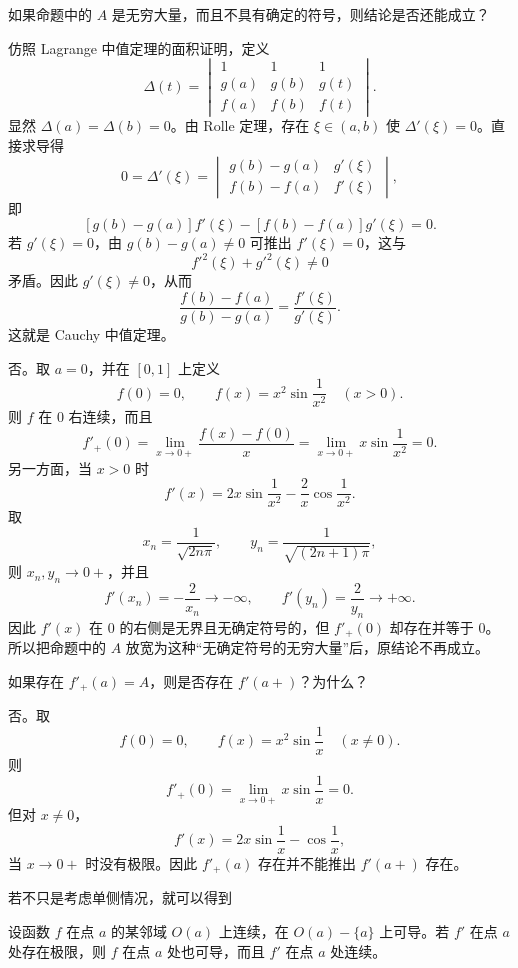\begin{xthought}[2]
如果命题中的 $A$ 是无穷大量，而且不具有确定的符号，则结论是否还能成立？
\end{xthought}
\begin{xsolution}
仿照 Lagrange 中值定理的面积证明，定义
\[
  \Delta(t)=
  \begin{vmatrix}
    1&1&1\\
    g(a)&g(b)&g(t)\\
    f(a)&f(b)&f(t)
  \end{vmatrix}.
\]
显然 $\Delta(a)=\Delta(b)=0$。由 Rolle 定理，存在 $\xi\in(a,b)$ 使 $\Delta'(\xi)=0$。直接求导得
\[
  0=\Delta'(\xi)
  =
  \begin{vmatrix}
    g(b)-g(a)&g'(\xi)\\
    f(b)-f(a)&f'(\xi)
  \end{vmatrix},
\]
即
\[
  [g(b)-g(a)]f'(\xi)-[f(b)-f(a)]g'(\xi)=0.
\]
若 $g'(\xi)=0$，由 $g(b)-g(a)\neq0$ 可推出 $f'(\xi)=0$，这与
\[
  f'^2(\xi)+g'^2(\xi)\neq0
\]
矛盾。因此 $g'(\xi)\neq0$，从而
\[
  \frac{f(b)-f(a)}{g(b)-g(a)}
  =\frac{f'(\xi)}{g'(\xi)}.
\]
这就是 Cauchy 中值定理。

否。取 $a=0$，并在 $[0,1]$ 上定义
\[
  f(0)=0,
  \qquad
  f(x)=x^2\sin\frac1{x^2}\quad(x>0).
\]
则 $f$ 在 $0$ 右连续，而且
\[
  f'_+(0)=\lim_{x\to0+}\frac{f(x)-f(0)}x
  =\lim_{x\to0+}x\sin\frac1{x^2}=0.
\]
另一方面，当 $x>0$ 时
\[
  f'(x)=2x\sin\frac1{x^2}-\frac2x\cos\frac1{x^2}.
\]
取
\[
  x_n=\frac1{\sqrt{2n\pi}},
  \qquad
  y_n=\frac1{\sqrt{(2n+1)\pi}},
\]
则 $x_n,y_n\to0+$，并且
\[
  f'(x_n)=-\frac2{x_n}\to-\infty,
  \qquad
  f'(y_n)=\frac2{y_n}\to+\infty.
\]
因此 $f'(x)$ 在 $0$ 的右侧是无界且无确定符号的，但 $f'_+(0)$ 却存在并等于 $0$。所以把命题中的 $A$ 放宽为这种“无确定符号的无穷大量”后，原结论不再成立。
\end{xsolution}


\begin{xthought}[3]
如果存在 $f'_+(a)=A$，则是否存在 $f'(a+)$？为什么？
\end{xthought}
\begin{xsolution}
否。取
\[
  f(0)=0,
  \qquad
  f(x)=x^2\sin\frac1x\quad(x\neq0).
\]
则
\[
  f'_+(0)=\lim_{x\to0+}x\sin\frac1x=0.
\]
但对 $x\neq0$，
\[
  f'(x)=2x\sin\frac1x-\cos\frac1x,
\]
当 $x\to0+$ 时没有极限。因此 $f'_+(a)$ 存在并不能推出 $f'(a+)$ 存在。
\end{xsolution}


若不只是考虑单侧情况，就可以得到

\begin{xtheorem}[导数极限定理]
设函数 $f$ 在点 $a$ 的某邻域 $O(a)$ 上连续，在 $O(a)-\{a\}$ 上可导。若 $f'$ 在点 $a$ 处存在极限，则 $f$ 在点 $a$ 处也可导，而且 $f'$ 在点 $a$ 处连续。
\end{xtheorem}

